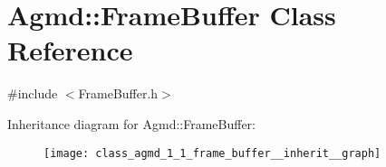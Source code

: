 \hypertarget{class_agmd_1_1_frame_buffer}{\section{Agmd\+:\+:Frame\+Buffer Class Reference}
\label{class_agmd_1_1_frame_buffer}
}


{\ttfamily \#include $<$Frame\+Buffer.\+h$>$}



Inheritance diagram for Agmd\+:\+:Frame\+Buffer\+:\nopagebreak
\begin{figure}[H]
\begin{center}
\leavevmode
\texttt{[image: class\_agmd\_1\_1\_frame\_buffer\_\_inherit\_\_graph]}
\end{center}
\end{figure}
